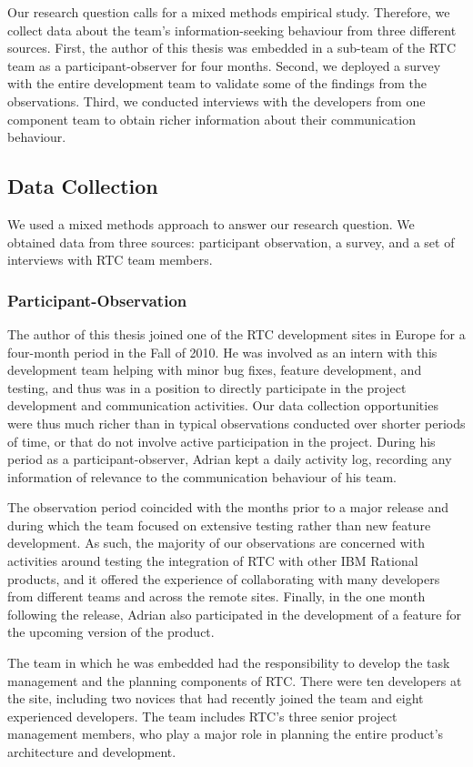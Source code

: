 Our research question calls for a mixed methods empirical study. Therefore, we collect data about the team's information-seeking behaviour from three different sources.
First, the author of this thesis was embedded in a sub-team of the RTC team as a participant-observer for four months.
Second, we deployed a survey with the entire development team to validate some of the findings from the observations.
Third, we conducted interviews with the developers from one component team to obtain richer information about their communication behaviour.


\subsection{Data Collection}
We used a mixed methods approach to answer our research question. We obtained data from three sources: participant observation, a survey, and a set of interviews with RTC team members.

\subsubsection{Participant-Observation}
The  author of this thesis joined one of the RTC development sites in Europe for a four-month period in the Fall of 2010. He was involved as an intern with this development team helping with minor bug fixes, feature development, and testing, and thus was in a position to directly participate in the project development and communication activities. Our data collection opportunities were thus much richer than in typical observations conducted over shorter periods of time, or that do not involve active participation in the project.  During his period as a participant-observer, Adrian kept a daily activity log, recording any information of relevance to the communication behaviour of his team.

The observation period coincided with the months prior to a major release and during which the team focused on extensive testing rather than new feature development. As such, the majority of our observations are concerned with activities around testing the integration of RTC with other IBM Rational products, and it offered the experience of collaborating with many developers from different teams and across the remote sites. Finally, in the one month following the release, Adrian also participated in the development of a feature for the upcoming version of the product.

The team in which he was embedded had the responsibility to develop the task management and the planning components of RTC. There were ten developers at the site, including two novices that had recently joined the team and eight experienced developers. The team includes RTC's three senior project management members, who play a major role in planning the entire product's architecture and development.


